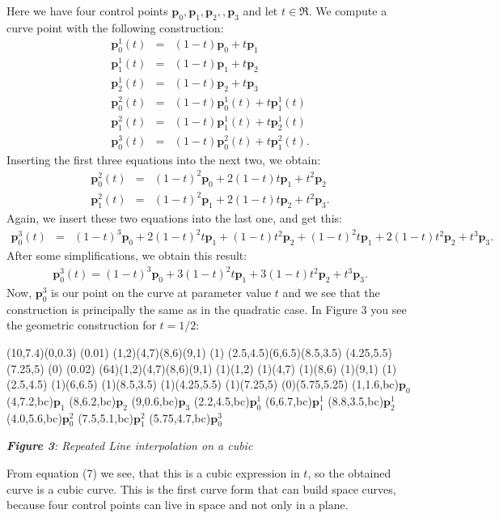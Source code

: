 \documentclass[titlepage,a4paper,11pt]{report}
\def\it{\textit}
\def\bf{\textbf}
\def\mb{\mathbf}
\begin{document}
Here we have four control points $\mb{p}_0,\mb{p}_1,\mb{p}_2,,\mb{p}_3$
and let $t\in \mb{\Re}$. We compute a curve point with the following
construction:
\begin{eqnarray*}
  \mb{p}_0^1(t) & = & (1-t)\mb{p}_0+t\mb{p}_1 \\
  \mb{p}_1^1(t) & = & (1-t)\mb{p}_1+t\mb{p}_2 \\
  \mb{p}_2^1(t) & = & (1-t)\mb{p}_2+t\mb{p}_3 \\
  \mb{p}_0^2(t) & = & (1-t)\mb{p}_0^1(t)+t\mb{p}_1^1(t) \\
  \mb{p}_1^2(t) & = & (1-t)\mb{p}_1^1(t)+t\mb{p}_2^1(t) \\
  \mb{p}_0^3(t) & = & (1-t)\mb{p}_0^2(t)+t\mb{p}_1^2(t).
\end{eqnarray*}
Inserting the first three equations into the next two, we obtain:
\begin{eqnarray*}
  \mb{p}_0^2(t) & = & (1-t)^2\mb{p}_0+2(1-t)t\mb{p}_1+t^2\mb{p}_2 \\
  \mb{p}_1^2(t) & = & (1-t)^2\mb{p}_1+2(1-t)t\mb{p}_2+t^2\mb{p}_3.
\end{eqnarray*}
Again, we insert these two equations into the last one, and get this:
\begin{eqnarray*}
  \mb{p}_0^3(t) & = & (1-t)^3\mb{p}_0+2(1-t)^2t\mb{p}_1+(1-t)t^2\mb{p}_2
  +(1-t)^2t\mb{p}_1+2(1-t)t^2\mb{p}_2+t^3\mb{p}_3.
\end{eqnarray*}
After some simplifications, we obtain this result:
\begin{eqnarray}
  \mb{p}_0^3(t)=(1-t)^3\mb{p}_0+3(1-t)^2t\mb{p}_1+3(1-t)t^2\mb{p}_2
  +t^3\mb{p}_3.
\end{eqnarray}
Now, $\mb{p}_0^3$ is our point on the curve at parameter value $t$ and
we see that the construction is principally the same as in the quadratic
case. In Figure 3 you see the geometric construction for $t=1/2$:
\begin{center}
\begin{lapdf}(10,7.4)(0,0.3)
  \Setwidth(0.01)
  \Black
  \Polygon(1,2)(4,7)(8,6)(9,1) \Stroke
  \Dash(1)
  \Polygon(2.5,4.5)(6,6.5)(8.5,3.5) \Stroke
  \Line(4.25,5.5)(7.25,5) \Stroke
  \Dash(0)
  \Setwidth(0.02)
  \Red
  \Curve(64)(1,2)(4,7)(8,6)(9,1) \Stroke
  \Point(1)(1,2)
  \Point(1)(4,7)
  \Point(1)(8,6)
  \Point(1)(9,1)
  \Point(1)(2.5,4.5)
  \Point(1)(6,6.5)
  \Point(1)(8.5,3.5)
  \Point(1)(4.25,5.5)
  \Point(1)(7.25,5)
  \Point(0)(5.75,5.25)
  \Text(1,1.6,bc){$\mb{p}_0$}
  \Text(4,7.2,bc){$\mb{p}_1$}
  \Text(8,6.2,bc){$\mb{p}_2$}
  \Text(9,0.6,bc){$\mb{p}_3$}
  \Text(2.2,4.5,bc){$\mb{p}_0^1$}
  \Text(6,6.7,bc){$\mb{p}_1^1$}
  \Text(8.8,3.5,bc){$\mb{p}_2^1$}
  \Text(4.0,5.6,bc){$\mb{p}_0^2$}
  \Text(7.5,5.1,bc){$\mb{p}_1^2$}
  \Text(5.75,4.7,bc){$\mb{p}_0^3$}
\end{lapdf}

\it{\bf{Figure 3}: Repeated Line interpolation on a cubic}
\end{center}
From equation (7) we see, that this is a cubic expression in $t$, so
the obtained curve is a cubic curve. This is the first curve form that
can build space curves, because four control points can live in space
and not only in a plane.
\end{document}
